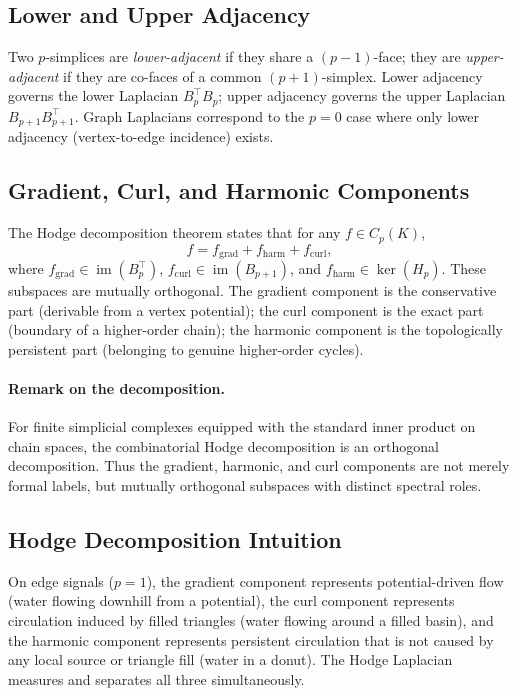 \documentclass[11pt]{article}
\theoremstyle{definition}
\theoremstyle{remark}
\DeclareMathOperator{\im}{im}
\begin{document}
\subsection{Lower and Upper Adjacency}

Two $p$-simplices are \emph{lower-adjacent} if they share a $(p-1)$-face; they
are \emph{upper-adjacent} if they are co-faces of a common $(p+1)$-simplex.
Lower adjacency governs the lower Laplacian $B_p^\top B_p$; upper adjacency
governs the upper Laplacian $B_{p+1}B_{p+1}^\top$. Graph Laplacians correspond
to the $p=0$ case where only lower adjacency (vertex-to-edge incidence) exists.

\subsection{Gradient, Curl, and Harmonic Components}

The Hodge decomposition theorem states that for any $f\in C_p(K)$,
\[
  f = f_{\mathrm{grad}} + f_{\mathrm{harm}} + f_{\mathrm{curl}},
\]
where $f_{\mathrm{grad}}\in\im(B_p^\top)$, $f_{\mathrm{curl}}\in\im(B_{p+1})$,
and $f_{\mathrm{harm}}\in\ker(H_p)$. These subspaces are mutually orthogonal.
The gradient component is the conservative part (derivable from a vertex
potential); the curl component is the exact part (boundary of a higher-order
chain); the harmonic component is the topologically persistent part (belonging
to genuine higher-order cycles).

\paragraph{Remark on the decomposition.}
For finite simplicial complexes equipped with the standard inner product on chain spaces, the combinatorial Hodge decomposition is an orthogonal decomposition. Thus the gradient, harmonic, and curl components are not merely formal labels, but mutually orthogonal subspaces with distinct spectral roles.

\subsection{Hodge Decomposition Intuition}

On edge signals ($p=1$), the gradient component represents potential-driven flow
(water flowing downhill from a potential), the curl component represents
circulation induced by filled triangles (water flowing around a filled basin),
and the harmonic component represents persistent circulation that is not caused
by any local source or triangle fill (water in a donut). The Hodge Laplacian
measures and separates all three simultaneously.
\end{document}
